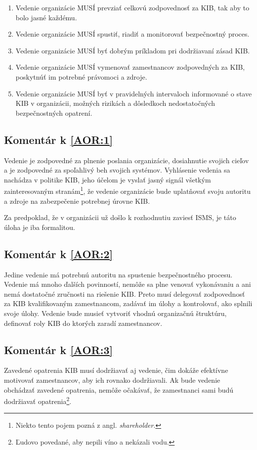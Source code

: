\begin{enumerate}
  \item \label{AOR:1} Vedenie organizácie MUSÍ prevziať celkovú zodpovednosť za KIB, tak aby to bolo jasné každému.
  \item \label{AOR:2} Vedenie organizácie MUSÍ spustiť, riadiť a monitorovať bezpečnostný proces.
  \item \label{AOR:3} Vedenie organizácie MUSÍ byť dobrým príkladom pri dodržiavaní zásad KIB.
  \item \label{AOR:4} Vedenie organizácie MUSÍ vymenovať zamestnancov zodpovedných za KIB, poskytnúť im potrebné právomoci a zdroje.
  \item \label{AOR:5} Vedenie organizácie MUSÍ byť v pravidelných intervaloch informované o stave KIB v organizácii,
    možných rizikách a dôsledkoch nedostatočných bezpečnostných opatrení.
\end{enumerate}

\subsection*{Komentár k \ref{AOR:1}}
Vedenie je zodpovedné za plnenie poslania organizácie, dosiahnutie svojich cieľov a je zodpovedné za spoľahlivý beh svojich
systémov. Vyhlásenie vedenia sa nachádza v politike KIB, jeho účelom je vyslať jasný signál všetkým zainteresovaným
stranám\footnote{Niekto tento pojem pozná z angl. \textit{shareholder}.}, že vedenie organizácie bude uplatňovať svoju
autoritu a zdroje na zabezpečenie potrebnej úrovne KIB.

Za predpoklad, že v organizácii už došlo k rozhodnutiu zaviesť ISMS, je táto úloha je iba formalitou.

\subsection*{Komentár k \ref{AOR:2}}
Jedine vedenie má potrebnú autoritu na spustenie bezpečnostného procesu. Vedenie má mnoho ďalších povinností, nemôže sa
plne venovať vykonávaniu a ani nemá dostatočné zručnosti na riešenie KIB. Preto musí delegovať zodpovednosť za KIB
kvalifikovaným zamestnancom, zadávať im úlohy a kontrolovať, ako splnili svoje úlohy. Vedenie bude musieť vytvoriť
vhodnú organizačnú štruktúru, definovať roly KIB do ktorých zaradí zamestnancov.

\subsection*{Komentár k \ref{AOR:3}}
Zavedené opatrenia KIB musí dodržiavať aj vedenie, čim dokáže efektívne motivovať zamestnancov, aby ich rovnako dodržiavali.
Ak bude vedenie obchádzať zavedené opatrenia, nemôže očakávať, že zamestnanci sami budú dodržiavať opatrenia\footnote{Ľudovo
povedané, aby nepili víno a nekázali vodu.}.


